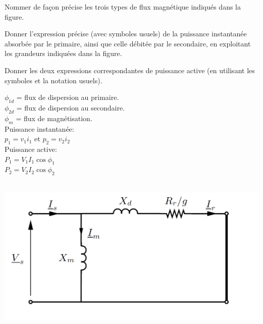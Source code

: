 \begin{questions}
{Nommer de façon précise les trois types de flux magnétique indiqués dans la figure.

Donner l'expression précise (avec symboles usuels) de la puissance instantanée absorbée par le primaire, ainsi que celle débitée par le secondaire, en exploitant les grandeurs indiquées dans la figure.

Donner les deux expressions correspondantes de puissance active (en utilisant les symboles et la notation usuels).
}
\begin{solution}
$\phi_{1d}$ = flux de dispersion au primaire.\\
$\phi_{2d}$ = flux de dispersion au secondaire.\\
$\phi_{m}$ = flux de magnétisation.\\

Puissance instantanée:\\
$p_1 = v_1 i_1$ et $p_2 = v_2 i_2$\\
Puissance active:\\
$P_1= V_1 I_1 \cos \phi_1$\\
$P_2= V_2 I_2 \cos \phi_2$\\
\end{solution}

\begin{solution}\\
\includegraphics[width= 0.7 \textwidth]{./img/schema_simpl}



\end{solution}
\end{questions}
